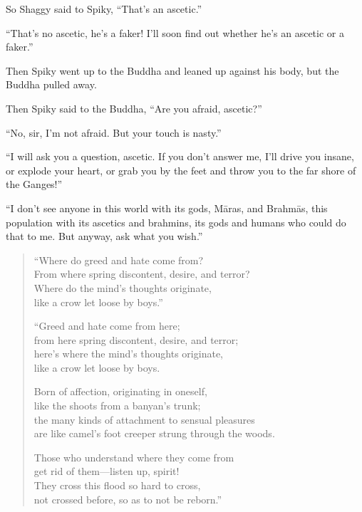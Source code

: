 \documentclass[12pt,openany]{book}%
\begin{document}
So Shaggy said to Spiky, “That’s an ascetic.” 

“That’s no ascetic, he’s a faker! I’ll soon find out whether he’s an ascetic or a faker.” 

Then Spiky went up to the Buddha and leaned up against his body, but the Buddha pulled away. 

Then Spiky said to the Buddha, “Are you afraid, ascetic?” 

“No, sir, I’m not afraid. But your touch is nasty.” 

“I will ask you a question, ascetic. If you don’t answer me, I’ll drive you insane, or explode your heart, or grab you by the feet and throw you to the far shore of the Ganges!” 

“I don’t see anyone in this world with its gods, \textsanskrit{Māras}, and \textsanskrit{Brahmās}, this population with its ascetics and brahmins, its gods and humans who could do that to me. But anyway, ask what you wish.” 

\begin{verse}%
“Where do greed and hate come from? \\
From where spring discontent, desire, and terror? \\
Where do the mind’s thoughts originate, \\
like a crow let loose by boys.” 

“Greed and hate come from here; \\
from here spring discontent, desire, and terror; \\
here’s where the mind’s thoughts originate, \\
like a crow let loose by boys. 

Born of affection, originating in oneself, \\
like the shoots from a banyan’s trunk; \\
the many kinds of attachment to sensual pleasures \\
are like camel’s foot creeper strung through the woods. 

Those who understand where they come from \\
get rid of them—listen up, spirit! \\
They cross this flood so hard to cross, \\
not crossed before, so as to not be reborn.” 

%
\end{verse}
\end{document}
